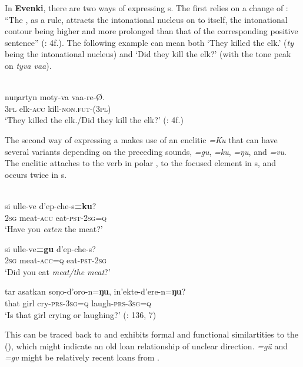 In \textbf{Evenki}, there are two ways of expressing s. The first relies on a change of : “The , as a rule, attracts the intonational nucleus on to itself, the intonational contour being higher and more prolonged than that of the corresponding positive sentence” (\citealt{Nedjalkov1997}: 4f.). The following example can mean both ‘They killed the elk.’ (\textit{ty} being the intonational nucleus) and ‘Did they kill the elk?’ (with the tone peak on \textit{tyva vaa}).

\ea%
    \label{ex:tungu:3}
    \\
    \gll nuŋartyn  moty-va vaa-re-Ø.\\
    3\textsc{pl}    elk-\textsc{acc}  kill-\textsc{non.fut}-(3\textsc{pl})\\
    \glt ‘They killed the elk./Did they kill the elk?’ (\citealt{Nedjalkov1997}: 4f.)
    \z

The second way of expressing a  makes use of an enclitic \textit{=Ku} that can have several variants depending on the preceding sounds, \textit{=gu}, \textit{=ku}, \textit{=ŋ}\textit{u}, and \textit{=vu}. The enclitic attaches to the verb in polar , to the focused element in s, and occurs twice in s.

\ea%
    \label{ex:tungu:4}
    \\
    \ea
    \gll si  ulle-ve      d’ep-che-s\textbf{{=ku}}?\\
    2\textsc{sg}    meat-\textsc{acc}    eat-\textsc{pst}-2\textsc{sg}=\textsc{q}\\
    \glt ‘Have you \textit{eaten} the meat?’
    
    \ex
    \gll si  ulle-ve\textbf{{=gu}} d’ep-che-s?\\
    2\textsc{sg}    meat-\textsc{acc}=\textsc{q}    eat-\textsc{pst}-2\textsc{sg}\\
    \glt ‘Did you eat \textit{meat/the meat}?’
    
    \ex
    \gll tar  asatkan  soŋo-d’oro-n=\textbf{{ŋu}},  in’ekte-d’ere-n=\textbf{{ŋu}}?\\
    that    girl    cry-\textsc{prs}-3\textsc{sg}=\textsc{q}  laugh-\textsc{prs}-3\textsc{sg}=\textsc{q}\\
    \glt ‘Is that girl crying or laughing?’ (\citealt{Nedjalkov1997}: 136, 7)
    \z
    \z

\noindent This  can be traced back to  \citep[147]{Benzing1956} and exhibits formal and functional similartities to the   (), which might indicate an old loan relationship of unclear direction.  \textit{=gü} and  \textit{=gv} might be relatively recent loans from .

